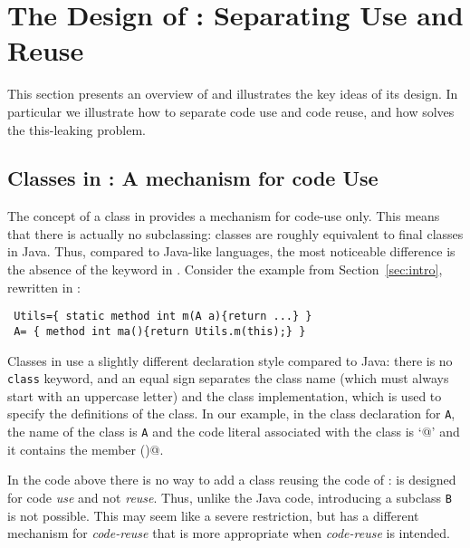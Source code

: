 \saveSpace
\section{The Design of \name: Separating Use and Reuse}\label{sec:separate}
\saveSpace\saveSpace
This section presents an overview of \name and illustrates the
key ideas of its design. In particular we illustrate how to separate code use and 
code reuse, and how \name solves the this-leaking problem.

\saveSpace\saveSpace
\subsection{Classes in \name: A mechanism for code Use}
\saveSpace
The concept of a class in \name provides a mechanism for code-use
only. This means that there is actually no subclassing:
classes are roughly equivalent to final classes in Java.  Thus,
compared to Java-like languages, the most noticeable difference is the
absence of the \Q@extends@ keyword in \name. 
Consider the example from Section~\ref{sec:intro}, rewritten in \name:
\saveSpace
\begin{lstlisting}
 Utils={ static method int m(A a){return ...} }
 A= { method int ma(){return Utils.m(this);} }
\end{lstlisting} 
\saveSpace
\noindent Classes in \name use a slightly different declaration style compared
to Java: there is no \lstinline{class} keyword, and an equal sign separates the class name (which must always start with
an uppercase letter) and the class implementation, which is used to specify the
definitions of the class. In our example, in the class declaration
for \lstinline{A}, the name of the class is \lstinline{A} and the code 
literal associated with the class is `@' and it contains the member  \Q@ma()@.


In the \name code above there is no way to add a class 
\Q@B@ reusing the code of \Q@A@: \Q@A@ is designed for code \emph{use} and not \emph{reuse}.
Thus, unlike the Java code, introducing a subclass
\lstinline{B} is not possible. This may seem like a severe restriction, but
\name has a different mechanism for \emph{code-reuse} that 
is more appropriate when \emph{code-reuse} is intended. 

